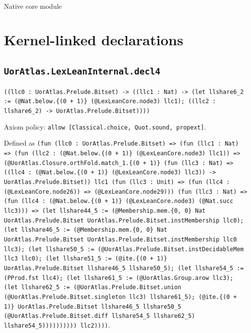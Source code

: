 \documentclass[11pt]{article}
\begin{document}
\begin{center}{\LARGE Native core module}\end{center}
\section*{Kernel-linked declarations}
\subsection*{\texttt{UorAtlas.LexLeanInternal.decl4}}
\noindent\texttt{((llc0 : UorAtlas.Prelude.Bitset) -> ((llc1 : Nat) -> (let llshare6\_2 := (@Nat.below.\{(0 + 1)\} (@LexLeanCore.node3) llc1); ((llc2 : llshare6\_2) -> UorAtlas.Prelude.Bitset))))}\par
\noindent Axiom policy: \texttt{allow [Classical.choice, Quot.sound, propext]}.\par
\noindent Defined as \texttt{(fun (llc0 : UorAtlas.Prelude.Bitset) => (fun (llc1 : Nat) => (fun (llc2 : (@Nat.below.\{(0 + 1)\} (@LexLeanCore.node3) llc1)) => (@UorAtlas.Closure.orthFold.match\_1.\{(0 + 1)\} (fun (llc3 : Nat) => ((llc4 : (@Nat.below.\{(0 + 1)\} (@LexLeanCore.node3) llc3)) -> UorAtlas.Prelude.Bitset)) llc1 (fun (llc3 : Unit) => (fun (llc4 : (@LexLeanCore.node26)) => (@LexLeanCore.node29))) (fun (llc3 : Nat) => (fun (llc4 : (@Nat.below.\{(0 + 1)\} (@LexLeanCore.node3) (@Nat.succ llc3))) => (let llshare44\_5 := (@Membership.mem.\{0, 0\} Nat UorAtlas.Prelude.Bitset UorAtlas.Prelude.Bitset.instMembership llc0); (let llshare46\_5 := (@Membership.mem.\{0, 0\} Nat UorAtlas.Prelude.Bitset UorAtlas.Prelude.Bitset.instMembership llc0 llc3); (let llshare50\_5 := (@UorAtlas.Prelude.Bitset.instDecidableMem llc3 llc0); (let llshare51\_5 := (@ite.\{(0 + 1)\} UorAtlas.Prelude.Bitset llshare46\_5 llshare50\_5); (let llshare54\_5 := (PProd.fst llc4); (let llshare61\_5 := (@UorAtlas.Group.arow llc3); (let llshare62\_5 := (@UorAtlas.Prelude.Bitset.union (@UorAtlas.Prelude.Bitset.singleton llc3) llshare61\_5); (@ite.\{(0 + 1)\} UorAtlas.Prelude.Bitset llshare46\_5 llshare50\_5 (@UorAtlas.Prelude.Bitset.diff llshare54\_5 llshare62\_5) llshare54\_5)))))))))) llc2))))}.\par
\end{document}

